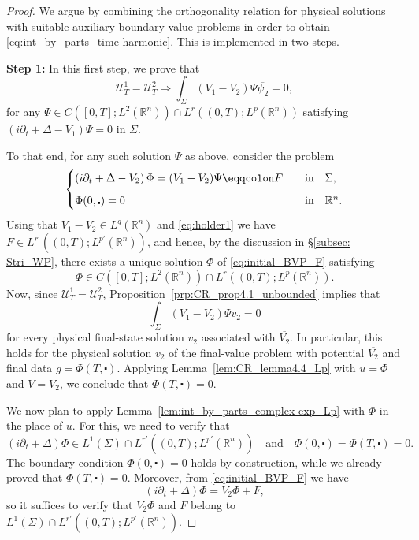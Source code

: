 \documentclass[11pt,a4paper]{amsart}
\theoremstyle{remark}
\theoremstyle{definition}
\newcommand{\R}{\mathbb{R}}
\def\cal{\mathcal}
\def\ovl{\overline}
\def\cd{\centerdot}
\def\d{\partial}
\begin{document}
\begin{proof}  We argue by combining the orthogonality relation for physical solutions with suitable auxiliary boundary value problems in order to obtain \eqref{eq:int_by_parts_time-harmonic}. This is implemented in two steps. 

\vspace{1em}
\noindent\textbf{Step 1:} In this first step, we prove that
\[
\cal{U}^1_T=\cal{U}^2_T \Rightarrow \int_\Sigma (V_1 - V_2) \Psi \ovl{\psi_2} = 0 ,
\]
for any $\Psi \in C([0, T]; L^2(\R^n)) \cap L^r((0, T); L^p(\R^n))$ satisfying $(i \d_t + \Delta - V_1)\Psi = 0$ in $\Sigma$. 

To that end, for any such solution \(\Psi\) as above, consider the problem
\begin{equation}\label{eq:initial_BVP_F}
\begin{cases}
\left(i \d_t + \Delta - V_2\right )\Phi = (V_1 - V_2)\Psi \eqqcolon F  \quad &\textrm{in}\quad \Sigma, 
\vspace{.6em}\\
\Phi(0, \cd) = 0  \quad &\textrm{in}\quad \R^n.
\end{cases}
\end{equation}
Using that $V_1-V_2 \in L^q(\R^n)$ and \eqref{eq:holder1} we have $F\in L^{r'}((0,T);L^{p'}(\R^n))$, and hence, by the discussion in \S\ref{subsec: Stri_WP}, there exists a unique solution \(\Phi\) of \eqref{eq:initial_BVP_F} satisfying
\[
\Phi\in C\left([0,T];L^2(\R^n)\right)\cap L^r\left((0,T);L^p(\R^n)\right).
\] 
Now, since $\mathcal U_T^1=\mathcal U_T^2$, Proposition~\ref{prp:CR_prop4.1_unbounded}
implies that
\[
\int_\Sigma (V_1-V_2)\Psi \overline{v_2}=0
\]
for every physical final-state solution $v_2$ associated with $\ovl{V_2}$. In particular, this holds for the physical solution $v_2$ of the final-value problem with potential $\ovl{V_2}$ and final data $g=\Phi(T,\cd)$. Applying Lemma~\ref{lem:CR_lemma4.4_Lp} with $u=\Phi$ and $V=\ovl{V_2}$, we conclude that
$\Phi(T,\cd)=0$.

We now plan to apply Lemma~\ref{lem:int_by_parts_complex-exp_Lp} with $\Phi$ in the place of $u$. For this, we need to verify that
\[
\left(i\partial_t+\Delta\right)\Phi \in L^1(\Sigma)\cap L^{r'}\left((0,T);L^{p'}(\R^n)\right) \quad\text{and}\quad \Phi(0,\cd)=\Phi(T,\cd)=0.
\]
The boundary condition $\Phi(0,\cd)=0$ holds by construction, while we already proved that $\Phi(T,\cd)=0$. Moreover, from \eqref{eq:initial_BVP_F} we have
\[
\left(i\partial_t+\Delta\right)\Phi = V_2\Phi + F,
\]
so it suffices to verify that $V_2\Phi$ and $F$ belong to $L^1(\Sigma)\cap L^{r'}((0,T);L^{p'}(\R^n))$.


\end{proof}
\end{document}
